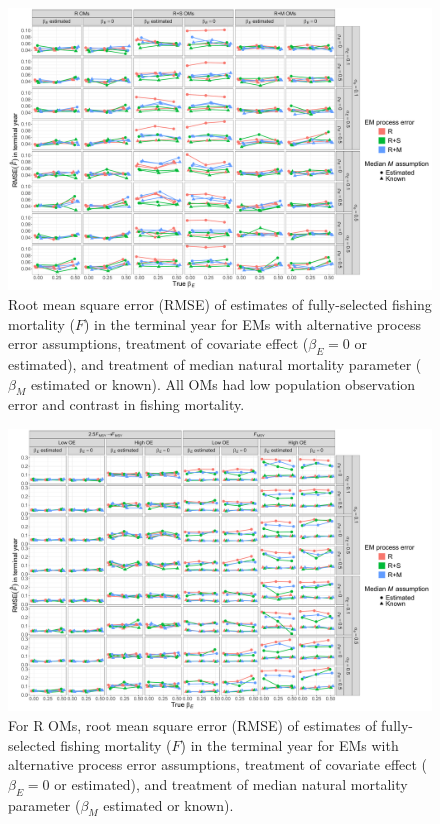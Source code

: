 \documentclass[
  12pt,
]{article}
\begin{document}
\begin{landscape}
\begin{figure}
\begin{center}
\includegraphics[height = \textheight]{terminal_year_F_rmse_main}
\end{center}
\caption{Root mean square error (RMSE) of estimates of fully-selected fishing mortality ($F$)  in the terminal year for EMs with alternative process error assumptions, treatment of covariate effect ($\beta_E = 0$ or estimated), and treatment of median natural mortality parameter ($\beta_M$ estimated or known). All OMs had low population observation error and contrast in fishing mortality.}\label{terminal_F_rmse}
\end{figure}
\end{landscape}

\begin{landscape}
\begin{figure}
\begin{center}
\includegraphics[height = \textheight]{terminal_year_F_rmse_Rom}
\end{center}
\caption{For R OMs, root mean square error (RMSE) of estimates of fully-selected fishing mortality ($F$)  in the terminal year for EMs with alternative process error assumptions, treatment of covariate effect ($\beta_E = 0$ or estimated), and treatment of median natural mortality parameter ($\beta_M$ estimated or known).}\label{terminal_F_rmse_Rom}
\end{figure}
\end{landscape}
\end{document}
